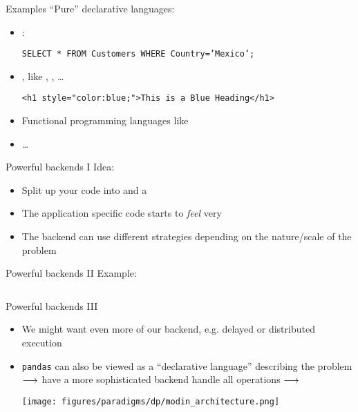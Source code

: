 \begin{frame}{Examples}
	\enquote{Pure} declarative languages:
	\begin{itemize}
		\item {} :
		\begin{center}
			\texttt{SELECT * FROM Customers WHERE Country='Mexico';}
		\end{center}
		\item {}, like ,  , \dots
		\begin{center}
			\texttt{<h1 style="color:blue;">This is a Blue Heading</h1>
			}
		\end{center}
		\item Functional programming languages like  
		\item \dots
\end{itemize}
\end{frame}
%
\begin{frame}{Powerful backends I}
	Idea:
	\begin{itemize}
		\item Split up your code into   and a  
		\item The application specific code starts to \emph{feel} very 
		\item The backend can use different strategies depending on the nature/scale of the problem
	\end{itemize}
\end{frame}
%
\begin{frame}{Powerful backends II}
	Example:
	\inputminted{python}{code/paradigms/dp/dataframes.py}
\end{frame}
%
%
\begin{frame}{Powerful backends III}
	\begin{itemize}
		\item We might want even more of our backend, e.g. delayed or distributed execution
		\item \texttt{pandas} can also be viewed as a \enquote{declarative language} describing the problem $\longrightarrow$ have a more sophisticated backend handle all operations $\longrightarrow$ 

		\texttt{[image: figures/paradigms/dp/modin\_architecture.png]}
	\end{itemize}
\end{frame}
